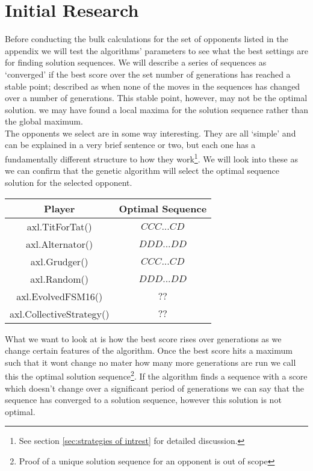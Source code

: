 \section{Initial Research}
Before conducting the bulk calculations for the set of opponents listed in the appendix we will test the algorithms' parameters to see what the best settings are for finding solution sequences.
We will describe a series of sequences as `converged' if the best score over the set number of generations has reached a stable point; described as when none of the moves in the sequences has changed over a number of generations.
This stable point, however, may not be the optimal solution.
we may have found a local maxima for the solution sequence rather than the global maximum. \\

The opponents we select are in some way interesting. 
They are all `simple' and can be explained in a very brief sentence or two, but each one has a fundamentally different structure to how they work\footnote{See section \ref{sec:strategies of intrest} for detailed discussion.}. 
We will look into these as we can confirm that the genetic algorithm will select the optimal sequence solution for the selected opponent. \\

\begin{center}
    \begin{tabular}{|c|c|} 
    \hline
    Player & Optimal Sequence \\
    \hline
    axl.TitForTat()&\(CCC...CD\)\\
    axl.Alternator()&\(DDD...DD\)\\
    axl.Grudger()&\(CCC...CD\)\\
    axl.Random()&\(DDD...DD\)\\
    axl.EvolvedFSM16()&\(??\)\\
    axl.CollectiveStrategy()&\(??\)\\
    \hline
    \end{tabular}
\end{center}


What we want to look at is how the best score rises over generations as we change certain features of the algorithm. 
Once the best score hits a maximum such that it wont change no mater how many more generations are run we call this the optimal solution sequence\footnote{Proof of a unique solution sequence for an opponent is out of scope}.
If the algorithm finds a sequence with a score which doesn't change over a significant period of generations we can say that the sequence has converged to a solution sequence, however this solution is not optimal. \\ 

